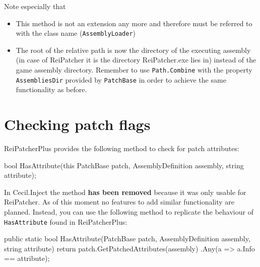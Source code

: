 \documentclass[a4paper,11pt]{article}
\newcommand{\CecilInject}{\textsc{C}{\scriptsize \sc ecil}.\textsc{I}{\scriptsize \sc nject}}
\begin{document}
\newpage
Note especially that
\begin{itemize}
\item This method is not an extension any more and therefore must be referred to with the class name (\texttt{AssemblyLoader})
\item The root of the relative path is now the directory of the executing assembly (in case of ReiPatcher it is the directory ReiPatcher.exe lies in) instead of the game assembly directory. Remember to use \texttt{Path.Combine} with the property \texttt{AssembliesDir} provided by \texttt{PatchBase} in order to achieve the same functionality as before.
\end{itemize}

\section{Checking patch flags}
ReiPatcherPlus provides the following method to check for patch attributes:
\begin{cs}
bool HasAttribute(this PatchBase patch, 
                  AssemblyDefinition assembly, 
                  string attribute);
\end{cs}
In \CecilInject{} the method \textbf{has been removed} because it was only usable for ReiPatcher. As of this moment no features to add similar functionality are planned. Instead, you can use the following method to replicate the behaviour of \texttt{HasAttribute} found in ReiPatcherPlus:
\begin{cs}
public static bool HasAttribute(PatchBase patch, 
                                AssemblyDefinition assembly, 
                                string attribute)
{
	return patch.GetPatchedAttributes(assembly)
                    .Any(a => a.Info == attribute);
}
\end{cs}
\end{document}
